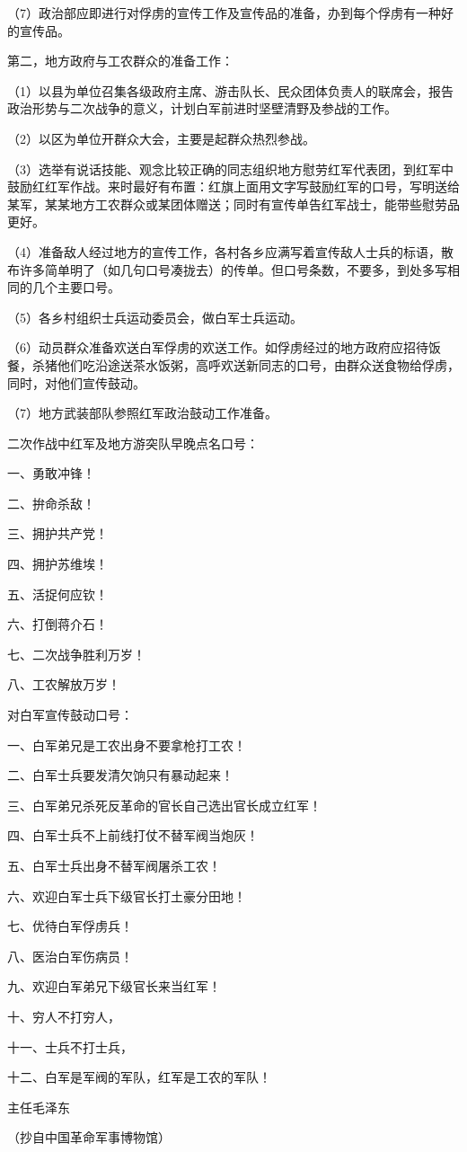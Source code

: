 （7）政治部应即进行对俘虏的宣传工作及宣传品的准备，办到每个俘虏有一种好的宣传品。

第二，地方政府与工农群众的准备工作：

（1）以县为单位召集各级政府主席、游击队长、民众团体负责人的联席会，报告政治形势与二次战争的意义，计划白军前进时坚壁清野及参战的工作。

（2）以区为单位开群众大会，主要是起群众热烈参战。

（3）选举有说话技能、观念比较正确的同志组织地方慰劳红军代表团，到红军中鼓励红红军作战。来时最好有布置：红旗上面用文字写鼓励红军的口号，写明送给某军，某某地方工农群众或某团体赠送；同时有宣传单告红军战士，能带些慰劳品更好。

（4）准备敌人经过地方的宣传工作，各村各乡应满写着宣传敌人士兵的标语，散布许多简单明了（如几句口号凑拢去）的传单。但口号条数，不要多，到处多写相同的几个主要口号。

（5）各乡村组织士兵运动委员会，做白军士兵运动。

（6）动员群众准备欢送白军俘虏的欢送工作。如俘虏经过的地方政府应招待饭餐，杀猪他们吃沿途送茶水饭粥，高呼欢送新同志的口号，由群众送食物给俘虏，同时，对他们宣传鼓动。

（7）地方武装部队参照红军政治鼓动工作准备。

二次作战中红军及地方游突队早晚点名口号：

一、勇敢冲锋！

二、拚命杀敌！

三、拥护共产党！

四、拥护苏维埃！

五、活捉何应钦！

六、打倒蒋介石！

七、二次战争胜利万岁！

八、工农解放万岁！

对白军宣传鼓动口号：

一、白军弟兄是工农出身不要拿枪打工农！

二、白军士兵要发清欠饷只有暴动起来！

三、白军弟兄杀死反革命的官长自己选出官长成立红军！

四、白军士兵不上前线打仗不替军阀当炮灰！

五、白军士兵出身不替军阀屠杀工农！

六、欢迎白军士兵下级官长打土豪分田地！

七、优待白军俘虏兵！

八、医治白军伤病员！

九、欢迎白军弟兄下级官长来当红军！

十、穷人不打穷人，

十一、士兵不打士兵，

十二、白军是军阀的军队，红军是工农的军队！


主任毛泽东

（抄自中国革命军事博物馆）



